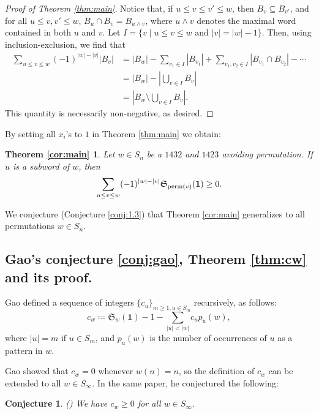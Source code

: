 \documentclass{amsart}
\newtheorem{conjecture}[theorem]{Conjecture}
\theoremstyle{definition}
\newtheorem*{theorem3*}{Theorem \ref{cor:main}}
\theoremstyle{named}
\newcommand*{\Schub}{\mathfrak{S}}
\begin{document}
\begin{proof}[Proof of Theorem \ref{thm:main}]
Notice that, if $u \le v \le v' \le w$, then $B_v \subseteq B_{v'}$, and for all $u \le v, v' \le w$, $B_u \cap B_v = B_{u \wedge v}$, where $u \wedge v$ denotes the maximal word contained in both $u$ and $v$. Let $I = \{ v \mid u \le v \le w \text{ and } \left|v\right| = \left|w\right| - 1 \}$. Then, using inclusion-exclusion, we find that
\begin{align}
\sum_{u \le v \le w} (-1)^{\left|w\right|-\left|v\right|} \left| B_v \right| &= \left|B_w\right| - \sum_{v_1 \in I} \left| B_{v_1} \right| + \sum_{v_1, v_2 \in I} \left| B_{v_1} \cap B_{v_2} \right| - \cdots \\
&= \left|B_w\right| - \left| \bigcup_{v \in I} B_v \right| \\
&= \left| B_w \setminus \bigcup_{v \in I} B_v \right|.
\end{align}
This quantity is necessarily non-negative, as desired.
\end{proof}

By setting all $x_i$'s to $1$ in  Theorem \ref{thm:main} we obtain:

\begin{theorem3*}  
\textit{Let $w \in S_n$ be a $1432$ and $1423$ avoiding permutation. If $u$ is a subword of $w$, then}
\[
\sum_{u \le v \le w} (-1)^{\left|w\right|-\left|v\right|} \Schub_{\textup{perm}(v)}({\bf 1})\geq 0.
\]
\end{theorem3*}

We conjecture (Conjecture \ref{conj:1.3}) that  Theorem \ref{cor:main}  generalizes to all permutations $w \in S_n$. 

\subsection{Gao's conjecture \ref{conj:gao}, Theorem \ref{thm:cw} and its proof.}
\label{sec:gao}
	Gao \cite{Gao}
defined a sequence of integers $\{c_u\}_{m \ge 1, u \in S_m}$ recursively, as follows:
\begin{equation} \label{eqn:c_w_defn}
c_w \coloneqq \Schub_w(\mathbf{1}) - 1 - \sum_{\left|u\right| < \left|w\right|} c_u p_u(w),
\end{equation}
where $\left|u\right| = m$ if $u \in S_m$, and $p_u(w)$ is the number of occurrences of $u$ as a pattern in $w$.

Gao
showed that $c_w = 0$ whenever $w(n) = n$, so the definition of $c_w$ can be extended to all $w \in S_\infty$. In the same paper, he conjectured the following:
\begin{conjecture}(\cite[Conjecture 3.2]{Gao}) \label{conj:gao2}
We have $c_w \ge 0$ for all $w \in S_\infty$.
\end{conjecture}
\end{document}
